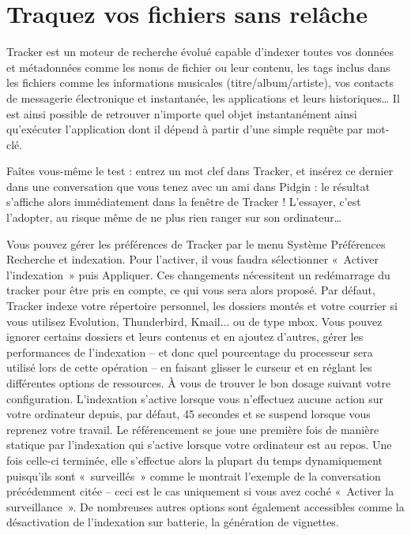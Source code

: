 \section{Traquez vos fichiers sans relâche}
\label{RefTracker}
Tracker est un moteur de recherche évolué capable d'indexer toutes vos données et métadonnées comme les noms de fichier ou leur contenu, les tags inclus dans les fichiers comme les informations musicales (titre/album/artiste), vos contacts de messagerie électronique et instantanée, les applications et leurs historiques\ldots{} Il est ainsi possible de retrouver n'importe quel objet instantanément ainsi qu'exécuter l'application dont il dépend à partir d'une simple requête par mot-clé.\par
Faîtes vous-même le test : entrez un mot clef dans Tracker, et insérez ce dernier dans une conversation que vous tenez avec un ami dans Pidgin : le résultat s'affiche alors immédiatement dans la fenêtre de Tracker ! L'essayer, c'est l'adopter, au risque même de ne plus rien ranger sur son ordinateur\ldots{}\par
Vous pouvez gérer les préférences de Tracker par le menu Système \FlecheDroite Préférences \FlecheDroite Recherche et indexation. Pour l'activer, il vous faudra sélectionner «~Activer l'indexation~» puis Appliquer. Ces changements nécessitent un redémarrage du  tracker pour être pris en compte, ce qui vous sera alors proposé. Par défaut, Tracker indexe votre répertoire personnel, les dossiers montés et votre courrier si vous utilisez Evolution, Thunderbird, Kmail... ou de type mbox. Vous pouvez ignorer certains dossiers et leurs contenus et en ajoutez d'autres, gérer les performances de l'indexation -- et donc quel pourcentage du processeur sera utilisé lors de cette opération -- en faisant glisser le curseur et en réglant les différentes options de ressources. À vous de trouver le bon dosage suivant votre configuration. L'indexation s'active lorsque vous n'effectuez aucune action sur votre ordinateur depuis, par défaut, 45 secondes et se suspend lorsque vous reprenez votre travail. Le référencement se joue une première fois de manière statique par l'indexation qui s'active lorsque votre ordinateur est au repos. Une fois celle-ci terminée, elle s'effectue alors la plupart du temps dynamiquement puisqu'ils sont «~surveillés~» comme le montrait l'exemple de la conversation précédemment citée -- ceci est le cas uniquement si vous avez coché «~Activer la surveillance~». De nombreuses autres options sont également accessibles comme la désactivation de l'indexation sur batterie, la génération de vignettes.\par
